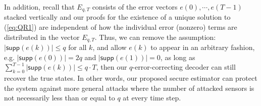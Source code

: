 \documentclass[12pt, conference, a4paper, twoside]{IEEEconf_mod}
\begin{document}
In addition, recall that $E_{q,T}$ consists of the error vectors $e(0), \cdots, e(T-1)$ stacked vertically and our proofs for the existence of a unique solution to (\ref{eq:QR1}) are independent of how the individual error (nonzero) terms are distributed in the vector $E_{q,T}$. Thus, we can remove the assumption: $\lvert \textsf{supp} (e(k)) \rvert \le q$ for all $k$, and allow $e(k)$ to appear in an arbitrary fashion, e.g. $\lvert \textsf{supp} (e(0)) \rvert = 2q$ and $\lvert \textsf{supp} (e(1)) \rvert = 0$, as long as $\sum_{k=0}^{T-1} \lvert \textsf{supp} (e(k)) \rvert \leq q\cdot T$, then our $q$-error-correcting decoder can still recover the true states. In other words, our proposed secure estimator can protect the system against more general attacks where the number of attacked sensors is not necessarily less than or equal to $q$ at every time step.
\end{document}
